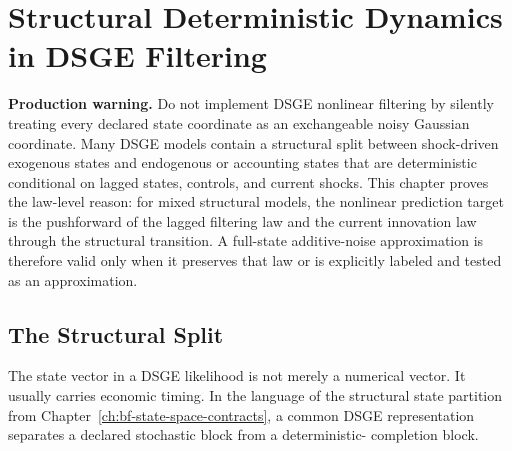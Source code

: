 \chapter[Structural DSGE Dynamics]{Structural Deterministic Dynamics in DSGE Filtering}
\label{ch:bf-structural-deterministic-dynamics}

\begin{mdframed}
\textbf{Production warning.}
Do not implement DSGE nonlinear filtering by silently treating every declared
state coordinate as an exchangeable noisy Gaussian coordinate.  Many DSGE
models contain a structural split between shock-driven exogenous states and
endogenous or accounting states that are deterministic conditional on lagged
states, controls, and current shocks.  This chapter proves the law-level reason:
for mixed structural models, the nonlinear prediction target is the pushforward
of the lagged filtering law and the current innovation law through the
structural transition.  A full-state additive-noise approximation is therefore
valid only when it preserves that law or is explicitly labeled and tested as an
approximation.
\end{mdframed}

\section{The Structural Split}
\label{sec:bf-dsge-structural-split}

The state vector in a DSGE likelihood is not merely a numerical vector.  It
usually carries economic timing.  In the language of the structural state
partition from Chapter~\ref{ch:bf-state-space-contracts}, a common DSGE
representation separates a declared stochastic block from a deterministic-
completion block.


